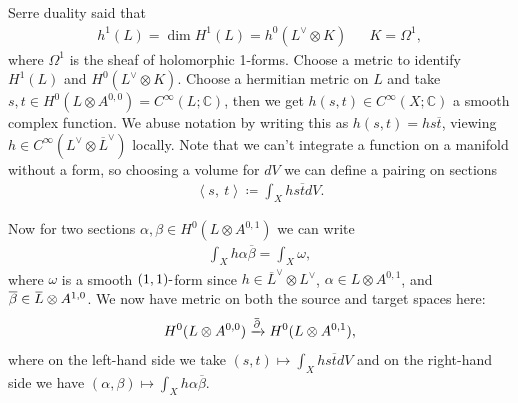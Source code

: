 \begin{remark}

Serre duality said that
\begin{align*}
h^1(L) = \dim H^1(L) = h^0( L^\vee\otimes K) && K = \Omega^1
,\end{align*}
where \(\Omega^1\) is the sheaf of holomorphic 1-forms. Choose a metric
to identify \(H^1(L)\) and \(H^0(L^\vee\otimes K)\). Choose a hermitian
metric on \(L\) and take
\(s, t\in H^0(L\otimes A^{0, 0}) = C^\infty(L; {\mathbb{C}})\), then we
get \(h(s, t) \in C^{\infty }(X; {\mathbb{C}})\) a smooth complex
function. We abuse notation by writing this as
\(h(s, t) = hs{\overline{{t}}}\), viewing
\(h\in C^{\infty }(L^\vee\otimes{\overline{{L}}}^\vee)\) locally. Note
that we can't integrate a function on a manifold without a form, so
choosing a volume for \(dV\) we can define a pairing on sections
\begin{align*}
{\left\langle {s},~{t} \right\rangle} \coloneqq\int_X hs{\overline{{t}}} dV
.\end{align*}

Now for two sections \(\alpha, \beta\in H^0(L\otimes A^{0, 1})\) we can
write
\begin{align*}
\int_X h \alpha {\overline{{ \beta}}} = \int_X \omega
,\end{align*}
where \(\omega\) is a smooth \((1, 1){\hbox{-}}\)form since
\(h\in {\overline{{L}}}^\vee\otimes L^\vee\),
\(\alpha\in L\otimes A^{0, 1}\), and
\({\overline{{ \beta}}} \in \mkern 1.5mu\overline{\mkern-1.5muL\mkern-1.5mu}\mkern 1.5mu \otimes A^{1, 0}\).
We now have metric on both the source and target spaces here:
\begin{align*}
H^0( L\otimes A^{0, 0}) \xrightarrow{\mkern 1.5mu\overline{\mkern-1.5mu{\partial}\mkern-1.5mu}\mkern 1.5mu} H^0(L\otimes A^{0, 1})
,\end{align*}
where on the left-hand side we take
\((s, t) \mapsto \int_X hs{\overline{{t}}}dV\) and on the right-hand
side we have
\((\alpha, \beta) \mapsto \int_X h \alpha{\overline{{\beta}}}\).

\end{remark}

